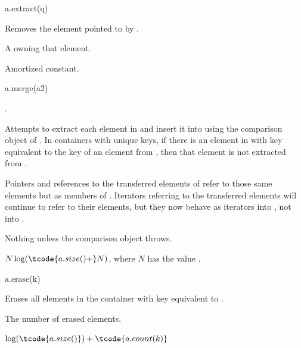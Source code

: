 %
\begin{itemdecl}
a.extract(q)
\end{itemdecl}

\begin{itemdescr}
\pnum
\result
{}

\pnum
\effects
Removes the element pointed to by .

\pnum
\returns
A  owning that element.

\pnum
\complexity
Amortized constant.
\end{itemdescr}

%
\begin{itemdecl}
a.merge(a2)
\end{itemdecl}

\begin{itemdescr}
\pnum
\result
{}

\pnum
\expects
{}.

\pnum
\effects
Attempts to extract each element in  and insert it into 
using the comparison object of .
In containers with unique keys,
if there is an element in  with key equivalent to
the key of an element from ,
then that element is not extracted from .

\pnum
\ensures
Pointers and references to the transferred elements of 
refer to those same elements but as members of .
Iterators referring to the transferred elements
will continue to refer to their elements,
but they now behave as iterators into , not into .

\pnum
\throws
Nothing unless the comparison object throws.

\pnum
\complexity
$N \log(\tcode{a.size()+} N)$, where $N$ has the value .
\end{itemdescr}

%
\begin{itemdecl}
a.erase(k)
\end{itemdecl}

\begin{itemdescr}
\pnum
\result
{}

\pnum
\effects
Erases all elements in the container with key equivalent to .

\pnum
\returns
The number of erased elements.

\pnum
\complexity
$\log (\tcode{a.size()}) + \tcode{a.count(k)}$
\end{itemdescr}

